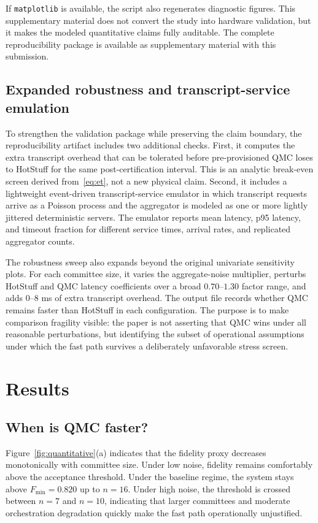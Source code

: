 \documentclass{ieeeaccess}
\begin{document}
If \texttt{matplotlib} is available, the script also regenerates diagnostic figures. This supplementary material does not convert the study into hardware validation, but it makes the modeled quantitative claims fully auditable. The complete reproducibility package is available as supplementary material with this submission.

\subsection{Expanded robustness and transcript-service emulation}
To strengthen the validation package while preserving the claim boundary, the reproducibility artifact includes two additional checks. First, it computes the extra transcript overhead that can be tolerated before pre-provisioned QMC loses to HotStuff for the same post-certification interval. This is an analytic break-even screen derived from~\eqref{eq:et}, not a new physical claim. Second, it includes a lightweight event-driven transcript-service emulator in which transcript requests arrive as a Poisson process and the aggregator is modeled as one or more lightly jittered deterministic servers. The emulator reports mean latency, p95 latency, and timeout fraction for different service times, arrival rates, and replicated aggregator counts.

The robustness sweep also expands beyond the original univariate sensitivity plots. For each committee size, it varies the aggregate-noise multiplier, perturbs HotStuff and QMC latency coefficients over a broad $0.70$--$1.30$ factor range, and adds $0$--$8$ ms of extra transcript overhead. The output file  records whether QMC remains faster than HotStuff in each configuration. The purpose is to make comparison fragility visible: the paper is not asserting that QMC wins under all reasonable perturbations, but identifying the subset of operational assumptions under which the fast path survives a deliberately unfavorable stress screen.

\section{Results}
\label{sec:results}
\subsection{When is QMC faster?}
Figure~\ref{fig:quantitative}(a) indicates that the fidelity proxy decreases monotonically with committee size. Under low noise, fidelity remains comfortably above the acceptance threshold. Under the baseline regime, the system stays above $F_{\min}=0.820$ up to $n=16$. Under high noise, the threshold is crossed between $n=7$ and $n=10$, indicating that larger committees and moderate orchestration degradation quickly make the fast path operationally unjustified.
\end{document}
